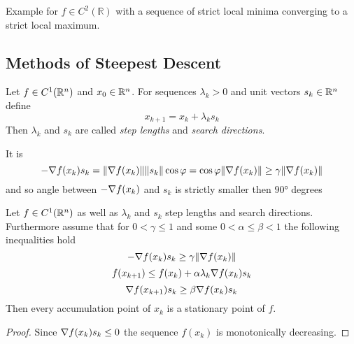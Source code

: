 \begin{algorithm}\label{algo:golden_section_search}
\end{algorithm}
\inputminted[fontsize=\small, framesep=0.35cm, frame=lines, python3=true]{python}{python/golden_section.py}
\bigskip

\begin{exercise}
    Example for \( f \in C^2(\mathbb{R}) \) with a sequence of strict local minima converging to a strict local maximum.
\end{exercise}
\bigskip



\subsection{Methods of Steepest Descent}
\bigskip


\begin{definition}
    Let \( f \in C^1(\mathbb{R}^n) \) and \( x_0 \in \mathbb{R}^n \). For sequences \( \lambda_k > 0 \) and
    unit vectors \( s_k \in \mathbb{R}^n \) define
    \[
        x_{k + 1} = x_k + \lambda_k s_k
    \]
    Then \( \lambda_k \) and  \( s_k \) are called \emph{step lengths} and \emph{search directions}.
\end{definition}
\bigskip


\begin{remark}
    It is
    \[
        - \nabla f(x_k) s_k = \|\nabla f(x_k)\| \|s_k\| \cos\varphi =
        \cos\varphi \|\nabla f(x_k)\| \ge \gamma \|\nabla f(x_k)\|
    \]
    and so angle between \( -\nabla f(x_k) \) and \( s_k \) is strictly smaller then \( \ang{90} \) degrees
\end{remark}
\bigskip


\begin{theorem}\label{thm:steepest_descent}
    Let \( f \in C^1(\mathbb{R}^n) \) as well as \( \lambda_k \) and \( s_k \) step lengths and search directions.
    Furthermore assume that for \( 0 < \gamma \le 1 \) and some \( 0 < \alpha \le \beta < 1 \) 
    the following inequalities hold
    \[
        - \nabla f(x_k) s_k \ge \gamma \|\nabla f(x_k)\|
    \]
    \[
        f(x_{k + 1}) \le f(x_k) + \alpha \lambda_k \nabla f(x_k) s_k
    \]
    \[
        \nabla f(x_{k + 1}) s_k \ge \beta \nabla f(x_k) s_k
    \]
    Then every accumulation point of \( x_k \) is a stationary point of \( f \).
\end{theorem}

\begin{proof}
    Since \( \nabla f(x_k) s_k \le 0 \) the sequence \( f(x_k) \) is monotonically decreasing.
\end{proof}
